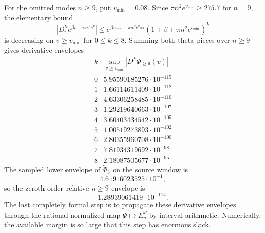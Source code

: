 \documentclass[11pt]{article}
\begin{document}
For the omitted modes \(n\ge9\), put \(v_{\min}=0.08\).  Since
\(\pi n^2 e^{v_{\min}}\ge 275.7\) for \(n=9\), the elementary bound
\[
\left|D_v^k e^{\beta v-\pi n^2e^v}\right|
\le
e^{\beta v_{\min}-\pi n^2 e^{v_{\min}}}
\left(1+\beta+\pi n^2 e^{v_{\min}}\right)^k
\]
is decreasing on \(v\ge v_{\min}\) for \(0\le k\le8\).  Summing both theta
pieces over \(n\ge9\) gives derivative envelopes
\[
\begin{array}{c|c}
k&\sup_{v\ge v_{\min}} |D^k\Phi_{\ge9}(v)|\\
0&5.95590185276\cdot10^{-115}\\
1&1.66114611409\cdot10^{-112}\\
2&4.63306258485\cdot10^{-110}\\
3&1.29219640663\cdot10^{-107}\\
4&3.60403434542\cdot10^{-105}\\
5&1.00519273893\cdot10^{-102}\\
6&2.80355960708\cdot10^{-100}\\
7&7.81934319692\cdot10^{-98}\\
8&2.18087505677\cdot10^{-95}
\end{array}
\]
The sampled lower envelope of \(\widetilde\Phi_3\) on the source window is
\[
  4.61916023525\cdot10^{-1},
\]
so the zeroth-order relative \(n\ge9\) envelope is
\[
  1.28939061419\cdot10^{-114}.
\]
The last completely formal step is to propagate these derivative envelopes
through the rational normalized map \(\Psi\mapsto E_u^\Psi\) by interval
arithmetic.  Numerically, the available margin is so large that this step has
enormous slack.
\end{document}
